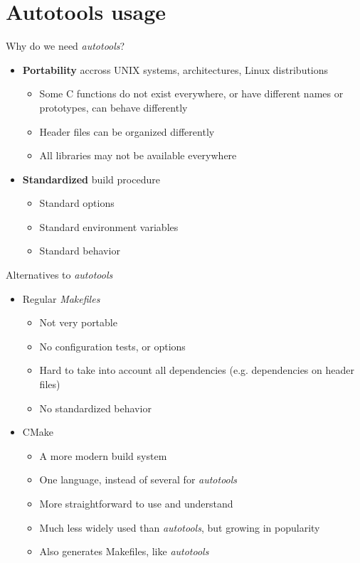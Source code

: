 \section{Autotools usage}

\begin{frame}{Why do we need {\em autotools}?}
  \begin{itemize}
  \item {\bf Portability} accross UNIX systems, architectures, Linux
    distributions
    \begin{itemize}
    \item Some C functions do not exist everywhere, or have different
      names or prototypes, can behave differently
    \item Header files can be organized differently
    \item All libraries may not be available everywhere
    \end{itemize}
  \item {\bf Standardized} build procedure
    \begin{itemize}
    \item Standard options
    \item Standard environment variables
    \item Standard behavior
    \end{itemize}
  \end{itemize}
\end{frame}

\begin{frame}{Alternatives to {\em autotools}}
  \begin{itemize}
  \item Regular {\em Makefiles}
    \begin{itemize}
    \item Not very portable
    \item No configuration tests, or options
    \item Hard to take into account all dependencies (e.g. dependencies
      on header files)
    \item No standardized behavior
    \end{itemize}
  \item CMake
    \begin{itemize}
    \item A more modern build system
    \item One language, instead of several for {\em autotools}
    \item More straightforward to use and understand
    \item Much less widely used than {\em autotools}, but growing in
      popularity
    \item Also generates Makefiles, like {\em autotools}
    \end{itemize}
  \end{itemize}
\end{frame}

